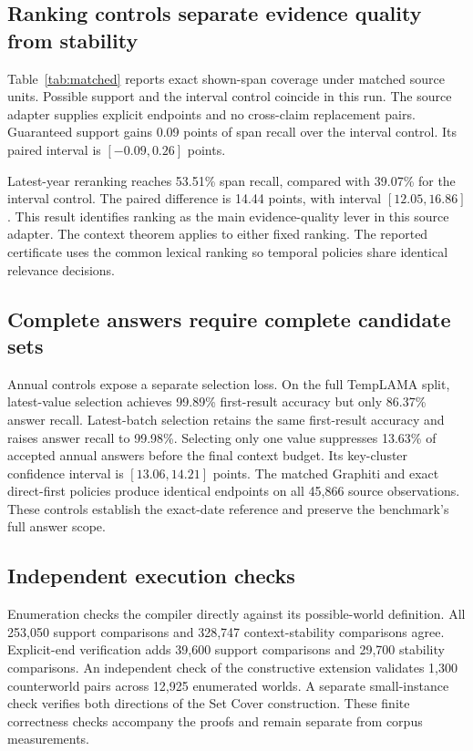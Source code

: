 \subsection{Ranking controls separate evidence quality from stability}

Table~\ref{tab:matched} reports exact shown-span coverage under matched source units.
Possible support and the interval control coincide in this run.
The source adapter supplies explicit endpoints and no cross-claim replacement pairs.
Guaranteed support gains 0.09 points of span recall over the interval control.
Its paired interval is $[-0.09,0.26]$ points.


Latest-year reranking reaches 53.51\% span recall, compared with 39.07\% for the interval control.
The paired difference is 14.44 points, with interval $[12.05,16.86]$.
This result identifies ranking as the main evidence-quality lever in this source adapter.
The context theorem applies to either fixed ranking.
The reported certificate uses the common lexical ranking so temporal policies share identical relevance decisions.



\subsection{Complete answers require complete candidate sets}

Annual controls expose a separate selection loss.
On the full TempLAMA split, latest-value selection achieves 99.89\% first-result accuracy but only 86.37\% answer recall.
Latest-batch selection retains the same first-result accuracy and raises answer recall to 99.98\%.
Selecting only one value suppresses 13.63\% of accepted annual answers before the final context budget.
Its key-cluster confidence interval is $[13.06,14.21]$ points.
The matched Graphiti and exact direct-first policies produce identical endpoints on all 45,866 source observations.
These controls establish the exact-date reference and preserve the benchmark's full answer scope.

\subsection{Independent execution checks}

Enumeration checks the compiler directly against its possible-world definition.
All 253,050 support comparisons and 328,747 context-stability comparisons agree.
Explicit-end verification adds 39,600 support comparisons and 29,700 stability comparisons.
An independent check of the constructive extension validates 1,300 counterworld pairs across 12,925 enumerated worlds.
A separate small-instance check verifies both directions of the Set Cover construction.
These finite correctness checks accompany the proofs and remain separate from corpus measurements.
